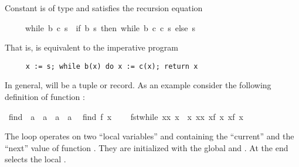 \begin{isabellebody}
\begin{isamarkuptext}
Constant  is of type 
and satisfies the recursion equation \begin{isabelle}%
\ \ \ \ \ while\ b\ c\ s\ {\isacharequal}\ {\isacharparenleft}if\ b\ s\ then\ while\ b\ c\ {\isacharparenleft}c\ s{\isacharparenright}\ else\ s{\isacharparenright}%
\end{isabelle}
That is,  is equivalent to the imperative program
\begin{verbatim}
     x := s; while b(x) do x := c(x); return x
\end{verbatim}
In general,  will be a tuple or record.  As an example
consider the following definition of function :%
\end{isamarkuptext}%
\isamarkuptrue%
\ find{}\ {\isacharcolon}{\isacharcolon}\ {\isachardoublequote}{\isacharparenleft}{\isacharprime}a\ {\isasymRightarrow}\ {\isacharprime}a{\isacharparenright}\ {\isasymRightarrow}\ {\isacharprime}a\ {\isasymRightarrow}\ {\isacharprime}a{\isachardoublequote}\isanewline
\ \ {\isachardoublequote}find{}\ f\ x\ {\isasymequiv}\isanewline
\ \ \ fst{\isacharparenleft}while\ {\isacharparenleft}{\isasymlambda}{\isacharparenleft}x{\isacharcomma}x{\isacharprime}{\isacharparenright}{\isachardot}\ x{\isacharprime}\ {\isasymnoteq}\ x{\isacharparenright}\ {\isacharparenleft}{\isasymlambda}{\isacharparenleft}x{\isacharcomma}x{\isacharprime}{\isacharparenright}{\isachardot}\ {\isacharparenleft}x{\isacharprime}{\isacharcomma}f\ x{\isacharprime}{\isacharparenright}{\isacharparenright}\ {\isacharparenleft}x{\isacharcomma}f\ x{\isacharparenright}{\isacharparenright}{\isachardoublequote}\isamarkupfalse%
%
\begin{isamarkuptext}%
\noindent
The loop operates on two ``local variables''  and 
containing the ``current'' and the ``next'' value of function .
They are initialized with the global  and . At the
end  selects the local .


\end{isamarkuptext}
\end{isabellebody}
